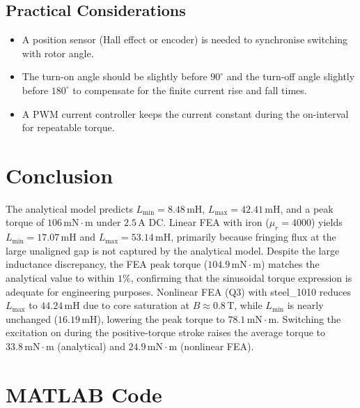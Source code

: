 \documentclass[12pt,a4paper]{article}
\newcommand{\unit}[1]{\,\mathrm{#1}}
\begin{document}
\subsection{Practical Considerations}

\begin{itemize}
  \item A position sensor (Hall effect or encoder) is needed to
        synchronise switching with rotor angle.
  \item The turn-on angle should be slightly before $90^{\circ}$ and
        the turn-off angle slightly before $180^{\circ}$ to compensate
        for the finite current rise and fall times.
  \item A PWM current controller keeps the current constant during the
        on-interval for repeatable torque.
\end{itemize}

\section{Conclusion}

The analytical model predicts $L_{\min} = 8.48\unit{mH}$,
$L_{\max} = 42.41\unit{mH}$, and a peak torque of
$106\unit{mN\cdot m}$ under $2.5\unit{A}$ DC.  Linear FEA with iron
($\mu_r = 4000$) yields $L_{\min} = 17.07\unit{mH}$ and
$L_{\max} = 53.14\unit{mH}$, primarily because fringing flux at the
large unaligned gap is not captured by the analytical model.  Despite
the large inductance discrepancy, the FEA peak torque
($104.9\unit{mN\cdot m}$) matches the analytical value to within $1\%$,
confirming that the sinusoidal torque expression is adequate for
engineering purposes.  Nonlinear FEA (Q3) with steel\_1010 reduces $L_{\max}$ to
$44.24\unit{mH}$ due to core saturation at $B \approx 0.8\unit{T}$,
while $L_{\min}$ is nearly unchanged ($16.19\unit{mH}$), lowering the
peak torque to $78.1\unit{mN\cdot m}$.  Switching the excitation on
during the positive-torque stroke raises the average torque to
$33.8\unit{mN\cdot m}$ (analytical) and $24.9\unit{mN\cdot m}$
(nonlinear FEA).

\appendix
\section{MATLAB Code}


\end{document}

